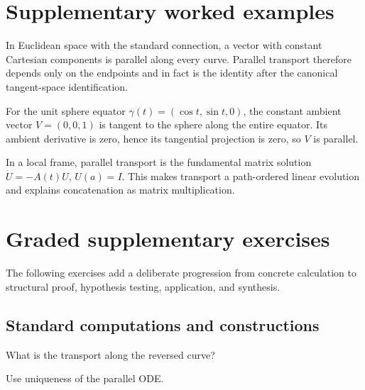 \section{Supplementary worked examples}
\label{sec:vii24-pedagogy}

\begin{example}\label{ex:vii24-ped-01}
In Euclidean space with the standard connection, a vector with constant Cartesian components is parallel along every curve.  Parallel transport therefore depends only on the endpoints and in fact is the identity after the canonical tangent-space identification.
\end{example}

\begin{example}\label{ex:vii24-ped-02}
For the unit sphere equator \(\gamma(t)=(\cos t,\sin t,0)\), the constant ambient vector \(V=(0,0,1)\) is tangent to the sphere along the entire equator.  Its ambient derivative is zero, hence its tangential projection is zero, so \(V\) is parallel.
\end{example}

\begin{example}\label{ex:vii24-ped-03}
In a local frame, parallel transport is the fundamental matrix solution \(\dot U=-A(t)U\), \(U(a)=I\).  This makes transport a path-ordered linear evolution and explains concatenation as matrix multiplication.
\end{example}

\section{Graded supplementary exercises}
The following exercises add a deliberate progression from concrete calculation to structural proof, hypothesis testing, application, and synthesis.

\subsection*{Standard computations and constructions}

\begin{exercise}\label{exr:vii24-ped-01}
What is the transport along the reversed curve?
\end{exercise}

\begin{hint}
Use uniqueness of the parallel ODE.
\end{hint}

